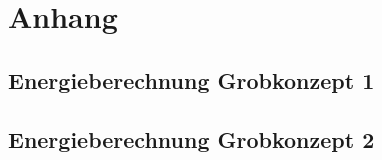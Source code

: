 \section{Anhang} \label{sec:anhang}

\subsection{Energieberechnung Grobkonzept 1} \label{subsec:grobkonzept1}

\subsection{Energieberechnung Grobkonzept 2} \label{subsec:grobkonzept2}
